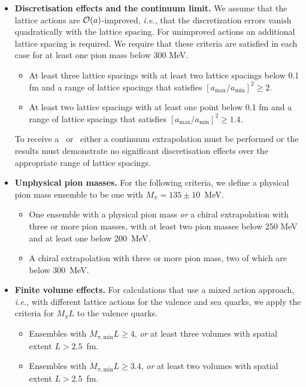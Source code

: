 \begin{itemize}
\item {\bfseries Discretisation effects and the continuum limit.} 
We assume that the lattice actions are ${\cal O}(a)$-improved, {\it i.e.}, 
that the discretization errors vanish quadratically with the lattice spacing. 
%
For unimproved actions an additional lattice spacing is required. 
%
We require that these criteria are satisfied in each case for at least one 
pion mass below 300 MeV.
%
\begin{itemize}
%
\item[\bstar] At least three lattice spacings with at least two lattice 
spacings below 0.1 fm and a range of lattice spacings that satisfies 
$[a_{\mathrm{max}}/a_{\mathrm{min}}]^2 \geq 2$.
%
\item[\bcirc] At least two lattice spacings with at least one point below 
0.1 fm and a range of lattice spacings that satisfies 
$[a_{\mathrm{max}}/a_{\mathrm{min}}]^2 \geq 1.4$.
%
\end{itemize}
%
To receive a \bstar~or \bcirc~either a continuum extrapolation must be 
performed or the results must demonstrate no significant discretisation 
effects over the appropriate range of lattice spacings.

\item {\bfseries Unphysical pion masses.} 
For the following criteria, we define a physical pion mass ensemble 
to be one with $M_\pi=135\pm 10$~MeV.
%
\begin{itemize}
\item[\bstar] One ensemble with a physical pion mass \emph{or} a chiral 
extrapolation with three or more pion masses, with at least two pion masses 
below 250 MeV and at least one below 200~MeV.
%
\item[\bcirc] A chiral extrapolation with three or more pion mass, two of 
which are below 300~MeV.
%
\end{itemize}

\item {\bfseries Finite volume effects.} 
%
For calculations that use a mixed action approach, {\it i.e.},
with different lattice actions for the valence and sea quarks, 
we apply the criteria for $M_\pi L$ to the valence quarks.
%
\begin{itemize}
%
\item[\bstar] Ensembles with $M_{\pi,\mathrm{min}}L\geq 4$, \emph{or} at least 
three volumes with spatial extent $L>2.5$~fm.
\item[\bcirc] Ensembles with $M_{\pi,\mathrm{min}}L \geq 3.4$, \emph{or} at least 
two volumes with spatial extent $L>2.5$~fm.
\end{itemize}


\end{itemize}
